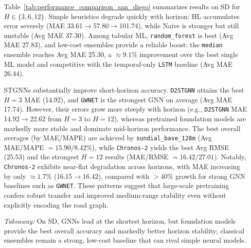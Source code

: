 \documentclass[10pt]{article}
\begin{document}
Table~\ref{tab:performance_comparison_san_diego} summarizes results on SD for $H\in\{3,6,12\}$.
Simple heuristics degrade quickly with horizon: HL accumulates error severely (MAE
33.61$\rightarrow$57.80$\rightarrow$101.74), while Naive is stronger but still unstable (Avg MAE 37.30).
Among tabular ML, \texttt{random\_forest} is best (Avg MAE 27.83), and low-cost ensembles provide a reliable boost:
the \texttt{median} ensemble reaches Avg MAE 25.30, a $\approx9.1\%$ improvement over the best single ML model and
competitive with the temporal-only \texttt{LSTM} baseline (Avg MAE 26.44).

STGNNs substantially improve short-horizon accuracy. \texttt{D2STGNN} attains the best $H{=}3$ MAE (14.92), and
\texttt{GWNET} is the strongest GNN on average (Avg MAE 17.74). However, their errors grow more steeply with
horizon (e.g., \texttt{D2STGNN} MAE 14.92$\rightarrow$22.62 from $H{=}3$ to $H{=}12$), whereas pretrained
foundation models are markedly more stable and dominate mid-horizon performance. The best overall averages
(by MAE/MAPE) are achieved by \texttt{sundial\_base\_128m} (Avg MAE/MAPE $=15.90/8.42\%$), while \texttt{Chronos-2}
yields the best Avg RMSE (25.53) and the strongest $H{=}12$ results (MAE/RMSE $=16.42/27.01$). Notably,
\texttt{Chronos-2} exhibits near-flat degradation across horizons, with MAE increasing by only $\approx 1.7\%$
(16.15$\rightarrow$16.42), compared with $>40\%$ growth for strong GNN baselines such as \texttt{GWNET}. These
patterns suggest that large-scale pretraining confers robust transfer and improved medium-range stability even
without explicitly encoding the road graph.


\begin{keydiscovery1}
\textit{Takeaway:} On SD, GNNs lead at the shortest horizon, but foundation models provide the best overall accuracy
and markedly better horizon stability; classical ensembles remain a strong, low-cost baseline that can rival simple
neural models.
\end{keydiscovery1}







\end{document}
